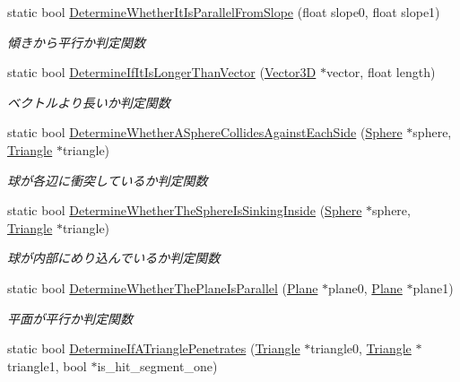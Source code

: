 \begin{DoxyCompactItemize}
static bool \mbox{\hyperlink{class_collision_calculation_a013889e5e69a001c229dcf083f884447}{Determine\+Whether\+It\+Is\+Parallel\+From\+Slope}} (float slope0, float slope1)
\begin{DoxyCompactList}\small\item\em 傾きから平行か判定関数 \end{DoxyCompactList}\item 
static bool \mbox{\hyperlink{class_collision_calculation_a37c172d64f5d30d772c9b9275215d83c}{Determine\+If\+It\+Is\+Longer\+Than\+Vector}} (\mbox{\hyperlink{class_vector3_d}{Vector3D}} $\ast$vector, float length)
\begin{DoxyCompactList}\small\item\em ベクトルより長いか判定関数 \end{DoxyCompactList}\item 
static bool \mbox{\hyperlink{class_collision_calculation_a05f88ea10634f6312ec556a202c2296d}{Determine\+Whether\+A\+Sphere\+Collides\+Against\+Each\+Side}} (\mbox{\hyperlink{class_sphere}{Sphere}} $\ast$sphere, \mbox{\hyperlink{class_triangle}{Triangle}} $\ast$triangle)
\begin{DoxyCompactList}\small\item\em 球が各辺に衝突しているか判定関数 \end{DoxyCompactList}\item 
static bool \mbox{\hyperlink{class_collision_calculation_a8878c4e262eb7027f4ae147a24c7ba33}{Determine\+Whether\+The\+Sphere\+Is\+Sinking\+Inside}} (\mbox{\hyperlink{class_sphere}{Sphere}} $\ast$sphere, \mbox{\hyperlink{class_triangle}{Triangle}} $\ast$triangle)
\begin{DoxyCompactList}\small\item\em 球が内部にめり込んでいるか判定関数 \end{DoxyCompactList}\item 
static bool \mbox{\hyperlink{class_collision_calculation_a53a77b483d1751ce918982c75eb2ac7c}{Determine\+Whether\+The\+Plane\+Is\+Parallel}} (\mbox{\hyperlink{class_plane}{Plane}} $\ast$plane0, \mbox{\hyperlink{class_plane}{Plane}} $\ast$plane1)
\begin{DoxyCompactList}\small\item\em 平面が平行か判定関数 \end{DoxyCompactList}\item 
static bool \mbox{\hyperlink{class_collision_calculation_a62c458a068b5ec44a04060ea2e5e1d47}{Determine\+If\+A\+Triangle\+Penetrates}} (\mbox{\hyperlink{class_triangle}{Triangle}} $\ast$triangle0, \mbox{\hyperlink{class_triangle}{Triangle}} $\ast$triangle1, bool $\ast$is\+\_\+hit\+\_\+segment\+\_\+one)

\end{DoxyCompactItemize}
